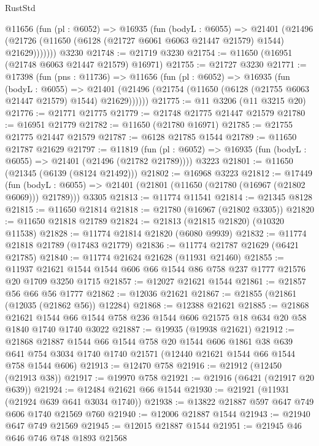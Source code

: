 \begin{lexlean}{RustStd}
\begin{coremodule}
      @11656
        (fun (pl : @6052) =>
        @16935
          (fun (bodyL : @6055) =>
          @21401
            (@21496 (@21726 (@11650 (@6128 (@21727 @6061 @6063 @21447 @21579) @1544) @21629)))))))
    @3230
@21748 := @21719 @3230
@21754 := @11650 (@16951 (@21748 @6063 @21447 @21579) @16971)
@21755 := @21727 @3230
@21771 := @17398
    (fun (pns : @11736) =>
    @11656
      (fun (pl : @6052) =>
      @16935
        (fun (bodyL : @6055) =>
        @21401 (@21496 (@21754 (@11650 (@6128 (@21755 @6063 @21447 @21579) @1544) @21629))))))
@21775 := @11 @3206 (@11 @3215 @20)
@21776 := @21771 @21775
@21779 := @21748 @21775 @21447 @21579
@21780 := @16951 @21779
@21782 := @11650 (@21780 @16971)
@21785 := @21755 @21775 @21447 @21579
@21787 := @6128 @21785 @1544
@21789 := @11650 @21787 @21629
@21797 := @11819
    (fun (pl : @6052) => @16935 (fun (bodyL : @6055) => @21401 (@21496 (@21782 @21789))))
    @3223
@21801 := @11650 (@21345 (@6139 (@8124 @21492)))
@21802 := @16968 @3223
@21812 := @17449
    (fun (bodyL : @6055) => @21401 (@21801 (@11650 (@21780 (@16967 (@21802 @6069))) @21789)))
    @3305
@21813 := @11774 @11541
@21814 := @21345 @8128
@21815 := @11650 @21814
@21818 := @21780 (@16967 (@21802 @3305))
@21820 := @11650 @21818 @21789
@21824 := @21813 (@21815 @21820) (@10320 @11538)
@21828 := @11774 @21814 @21820 (@6080 @9939)
@21832 := @11774 @21818 @21789 (@17483 @21779)
@21836 := @11774 @21787 @21629 (@6421 @21785)
@21840 := @11774 @21624 @21628 (@11931 @21460)
@21855 := @11937 @21621 @1544 @1544 @606 @66 @1544 @86 @758 @237 @1777 @21576 @20 @1709 @3250 @1715
@21857 := @12027 @21621 @1544
@21861 := @21857 @56 @66 @56 @1777
@21862 := @12036 @21621
@21867 := @21855 (@21861 (@12035 (@21862 @56)) @12284)
@21868 := @12388 @21621
@21885 := @21868
    @21621
    @1544
    @66
    @1544
    @758
    @236
    @1544
    @606
    @21575
    @18
    @634
    @20
    @58
    @1840
    @1740
    @1740
    @3022
@21887 := @19935 (@19938 @21621)
@21912 := @21868
    @21887
    @1544
    @66
    @1544
    @758
    @20
    @1544
    @606
    @1861
    @38
    @639
    @641
    @754
    @3034
    @1740
    @1740
    @21571
    (@12440 @21621 @1544 @66 @1544 @758 @1544 @606)
@21913 := @12470 @758
@21916 := @21912 (@12450 (@21913 @38))
@21917 := @19970 @758
@21921 := @21916 (@6421 (@21917 @20 @639))
@21924 := @12484 @21621 @66 @1544
@21930 := @21921 (@11931 (@21924 @639 @641 @3034 @1740))
@21938 := @13822 @21887 @597 @647 @749 @606 @1740 @21569 @760
@21940 := @12006 @21887 @1544
@21943 := @21940 @647 @749 @21569
@21945 := @12015 @21887 @1544
@21951 := @21945 @46 @646 @746 @748 @1893 @21568

\end{coremodule}
\end{lexlean}
